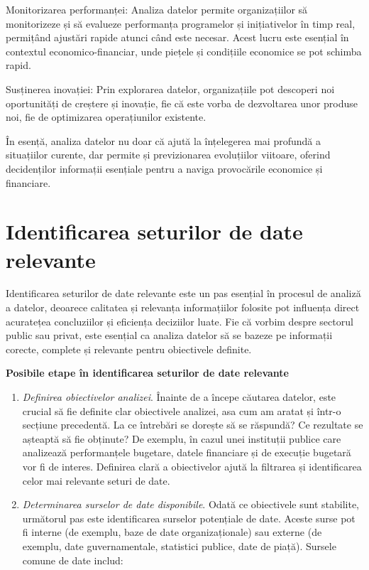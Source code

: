 \documentclass[
  11pt,
  b5paper,
  nottoc]{book}
\begin{document}
Monitorizarea performanței: Analiza datelor permite organizațiilor să
monitorizeze și să evalueze performanța programelor și inițiativelor în
timp real, permițând ajustări rapide atunci când este necesar. Acest
lucru este esențial în contextul economico-financiar, unde piețele și
condițiile economice se pot schimba rapid.

Susținerea inovației: Prin explorarea datelor, organizațiile pot
descoperi noi oportunități de creștere și inovație, fie că este vorba de
dezvoltarea unor produse noi, fie de optimizarea operațiunilor
existente.

În esență, analiza datelor nu doar că ajută la înțelegerea mai profundă
a situațiilor curente, dar permite și previzionarea evoluțiilor
viitoare, oferind decidenților informații esențiale pentru a naviga
provocările economice și financiare.

\section{Identificarea seturilor de date
relevante}\label{identificarea-seturilor-de-date-relevante}

Identificarea seturilor de date relevante este un pas esențial în
procesul de analiză a datelor, deoarece calitatea și relevanța
informațiilor folosite pot influența direct acuratețea concluziilor și
eficiența deciziilor luate. Fie că vorbim despre sectorul public sau
privat, este esențial ca analiza datelor să se bazeze pe informații
corecte, complete și relevante pentru obiectivele definite.

\textbf{Posibile etape în identificarea seturilor de date relevante}

\begin{enumerate}
\def\labelenumi{\arabic{enumi}.}
\item
  \emph{Definirea obiectivelor analizei}. Înainte de a începe căutarea
  datelor, este crucial să fie definite clar obiectivele analizei, asa
  cum am aratat și într-o secțiune precedentă. La ce întrebări se
  dorește să se răspundă? Ce rezultate se așteaptă să fie obținute? De
  exemplu, în cazul unei instituții publice care analizează
  performanțele bugetare, datele financiare și de execuție bugetară vor
  fi de interes. Definirea clară a obiectivelor ajută la filtrarea și
  identificarea celor mai relevante seturi de date.
\item
  \emph{Determinarea surselor de date disponibile}. Odată ce obiectivele
  sunt stabilite, următorul pas este identificarea surselor potențiale
  de date. Aceste surse pot fi interne (de exemplu, baze de date
  organizaționale) sau externe (de exemplu, date guvernamentale,
  statistici publice, date de piață). Sursele comune de date includ:\\
\end{enumerate}
\end{document}
